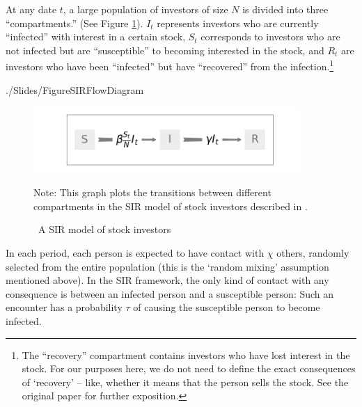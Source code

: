 At any date  $t$, a large population of investors of size $N$ is divided into three ``compartments.''  (See Figure \ref{fig:sir_diagram}).  $I_t$ represents investors who are currently ``infected'' with interest in a certain stock,  $S_t$ corresponds to investors who are not infected but are ``susceptible'' to becoming interested in the stock, and $R_t$ are investors who have been ``infected'' but have ``recovered'' from the infection.\footnote{The ``recovery'' compartment contains investors who have lost interest in the stock.  For our purposes here, we do not need to define the exact consequences of `recovery' -- like, whether it means that the person sells the stock.  See the original paper for further exposition.}
\begin{verbatimwrite}{./Slides/FigureSIRFlowDiagram}%
	\begin{figure}[!ht] \centering  %
		\caption{ ~A SIR model of stock investors}
		\label{fig:sir_diagram}
		\centerline{\includegraphics[width=0.9\textwidth]{./figures/flow_diagram.png}}
		\begin{flushleft}
			{\footnotesize Note: This graph plots the transitions between different compartments in the SIR model of stock investors described in \cite{shiller1989survey}. }
		\end{flushleft}
	\end{figure}
\end{verbatimwrite}%
\newcommand{\contactNum}{\chi}\newcommand{\tranProb}{\tau}\newcommand{\exposures}{\mathcal{E}}

In each period, each person is expected to have contact with $\contactNum$ others, randomly selected from the entire population (this is the `random mixing' assumption mentioned above).  In the SIR framework, the only kind of contact with any consequence is between an infected person and a susceptible person: Such an encounter has a probability $\tranProb$ of causing the susceptible person to become infected.

